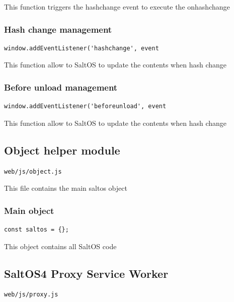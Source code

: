 \documentclass[a4paper]{article}
\begin{document}
This function triggers the hashchange event to execute the onhashchange

\hypertarget{toc258}{}
\subsubsection{Hash change management}

\begin{lstlisting}
window.addEventListener('hashchange', event
\end{lstlisting}

This function allow to SaltOS to update the contents when hash change

\hypertarget{toc259}{}
\subsubsection{Before unload management}

\begin{lstlisting}
window.addEventListener('beforeunload', event
\end{lstlisting}

This function allow to SaltOS to update the contents when hash change

\hypertarget{toc260}{}
\subsection{Object helper module}

\begin{lstlisting}
web/js/object.js
\end{lstlisting}

This file contains the main saltos object

\hypertarget{toc261}{}
\subsubsection{Main object}

\begin{lstlisting}
const saltos = {};
\end{lstlisting}

This object contains all SaltOS code

\hypertarget{toc262}{}
\subsection{SaltOS4 Proxy Service Worker}

\begin{lstlisting}
web/js/proxy.js
\end{lstlisting}
\end{document}
